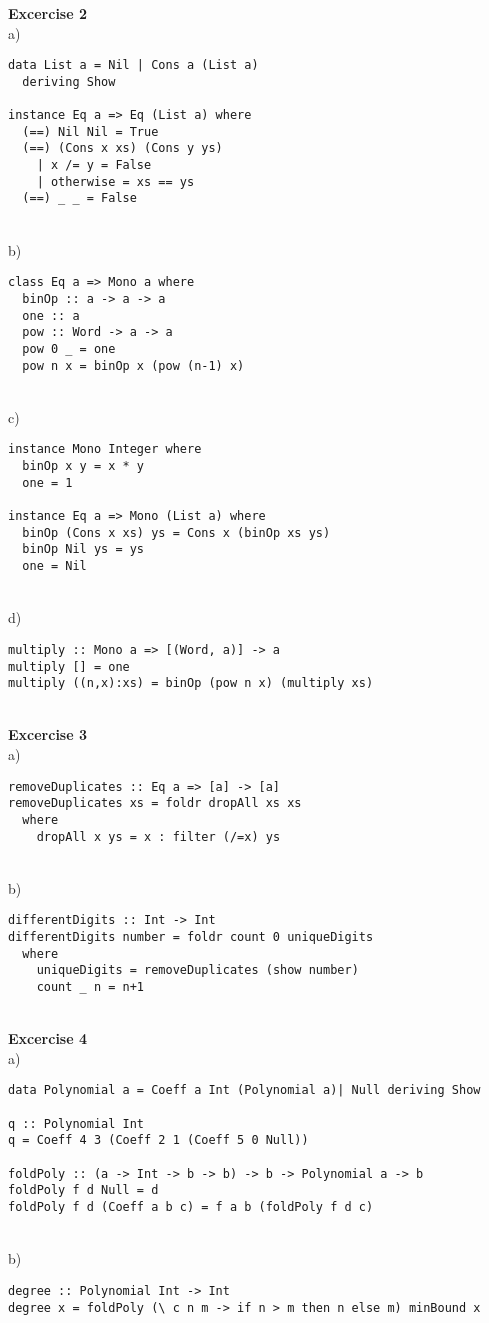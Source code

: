 \documentclass[a4paper,12pt,oneside]{book}
\begin{document}
\textbf{Excercise 2} \\%
a)
\begin{lstlisting}
data List a = Nil | Cons a (List a)
  deriving Show

instance Eq a => Eq (List a) where
  (==) Nil Nil = True
  (==) (Cons x xs) (Cons y ys)
    | x /= y = False
    | otherwise = xs == ys
  (==) _ _ = False
\end{lstlisting}
~\\     
b)
\begin{lstlisting}
class Eq a => Mono a where
  binOp :: a -> a -> a
  one :: a
  pow :: Word -> a -> a
  pow 0 _ = one
  pow n x = binOp x (pow (n-1) x)
\end{lstlisting}
~\\     
c)
\begin{lstlisting}
instance Mono Integer where
  binOp x y = x * y
  one = 1

instance Eq a => Mono (List a) where
  binOp (Cons x xs) ys = Cons x (binOp xs ys)
  binOp Nil ys = ys
  one = Nil
  \end{lstlisting}
~\\     
d)
\begin{lstlisting}
multiply :: Mono a => [(Word, a)] -> a
multiply [] = one
multiply ((n,x):xs) = binOp (pow n x) (multiply xs)
\end{lstlisting}
~\\     

\textbf{Excercise 3} \\%
a) 
\begin{lstlisting}
removeDuplicates :: Eq a => [a] -> [a]
removeDuplicates xs = foldr dropAll xs xs
  where
    dropAll x ys = x : filter (/=x) ys
\end{lstlisting}
~\\     
b)
\begin{lstlisting}
differentDigits :: Int -> Int
differentDigits number = foldr count 0 uniqueDigits
  where
    uniqueDigits = removeDuplicates (show number)
    count _ n = n+1
\end{lstlisting}
~\\     

\textbf{Excercise 4} \\%
a)
\begin{lstlisting}
data Polynomial a = Coeff a Int (Polynomial a)| Null deriving Show

q :: Polynomial Int
q = Coeff 4 3 (Coeff 2 1 (Coeff 5 0 Null))

foldPoly :: (a -> Int -> b -> b) -> b -> Polynomial a -> b
foldPoly f d Null = d
foldPoly f d (Coeff a b c) = f a b (foldPoly f d c)
\end{lstlisting}
~\\    
b)
\begin{lstlisting}
degree :: Polynomial Int -> Int
degree x = foldPoly (\ c n m -> if n > m then n else m) minBound x 
\end{lstlisting}
~\\    
\end{document}
